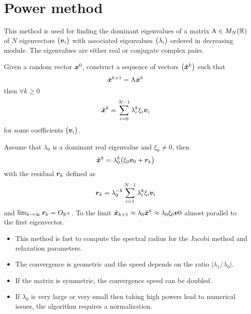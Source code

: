 \section{Power method}

This method is used for finding the dominant eigenvalues of a matrix ${\mathrm A} \in {M_N(\mathbb{R})}$ of $N$ eigenvectors $\bigl({{\boldsymbol v}}_i\bigr)$ with associated eigenvalues $\bigl(\lambda_i\bigr)$ ordered in decreasing module.
The eigenvalues are either real or conjugate complex pairs.

\medskip
Given a random vector ${\boldsymbol x}^0$, construct a sequence of vectors $\bigl(\hat{\boldsymbol x}^k\bigr)$ such that
\[
\hat{\boldsymbol x}^{k+1} = {\mathrm A} \hat{\boldsymbol x}^k
\]
then $\forall k \geq 0$
\[
\hat{\boldsymbol x}^k = \sum_{i=0}^{N-1} \lambda_i^k \xi_i {{\boldsymbol v}}_i
\]
for some coefficients $\bigl({{\boldsymbol v}}_i\bigr)$.

\medskip
Assume that $\lambda_0$ is a dominant real eigenvalue and $\xi_0 \neq 0$, then
\[
\hat{\boldsymbol x}^k = \lambda_0^k \bigl(\xi_0 {{\boldsymbol v}}_0 + {\boldsymbol r}_k \bigr)
\]
with the residual ${\boldsymbol r}_k$ defined as
\[
{\boldsymbol r}_k = \lambda_0^{-k} \sum_{i=1}^{N-1} \lambda_i^k \xi_i {{\boldsymbol v}}_i
\]
and $\lim_{k\rightarrow\infty} {\boldsymbol r}_k = O_{{\mathbb{R}^N}}$.
To the limit $\hat{\boldsymbol x}_{k+1} \approx \lambda_0 \hat{\boldsymbol x}^k \approx \lambda_0\xi_0{{\boldsymbol v}}0$ almost parallel to the first eigenvector.

\medskip
\begin{itemize}
\item This method is fast to compute the spectral radius for the Jacobi method and relaxation parameters.
\item The convergence is geometric and the speed depends on the ratio $\lvert \lambda_1 / \lambda_0\rvert$.
\item If the matrix is symmetric, the convergence speed can be doubled.
\item If $\lambda_0$ is very large or very small then taking high powers lead to numerical issues, the algorithm requires a normalization.
\end{itemize}
